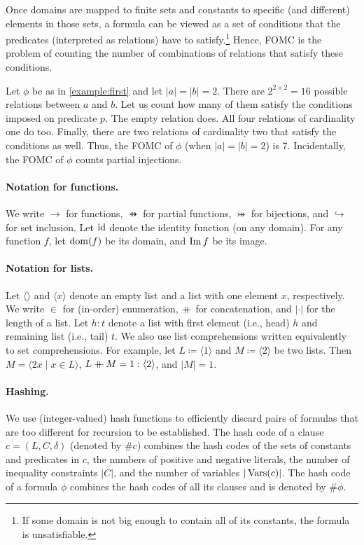 Once domains are mapped to finite sets and constants to specific (and different)
elements in those sets, a formula can be viewed as a set of conditions that the
predicates (interpreted as relations) have to satisfy.\footnote{If some domain
  is not big enough to contain all of its constants, the formula is
  unsatisfiable.} Hence, FOMC is the problem of counting the number of
combinations of relations that satisfy these conditions.

\begin{example}
  Let $\phi$ be as in \cref{example:first} and let $|a| = |b| = 2$. There are
  $2^{2 \times 2} = 16$ possible relations between $a$ and $b$. Let us count how
  many of them satisfy the conditions imposed on predicate $p$. The empty
  relation does. All four relations of cardinality one do too. Finally, there
  are two relations of cardinality two that satisfy the conditions as well.
  Thus, the FOMC of $\phi$ (when $|a| = |b| = 2$) is 7. Incidentally, the FOMC
  of $\phi$ counts partial injections.
\end{example}

\paragraph*{Notation for functions.}
We write $\to$ for functions, $\pfun$ for partial functions,
$\twoheadrightarrowtail$ for bijections, and $\hookrightarrow$ for set
inclusion. Let $\operatorname{id}$ denote the identity function (on any domain). For any
function $f$, let $\operatorname{dom}(f)$ be its domain, and $\operatorname{Im} f$ be its image.

\paragraph*{Notation for lists.}
Let $\langle\rangle$ and $\langle x \rangle$ denote an empty list and a list
with one element $x$, respectively. We write $\in$ for (in-order) enumeration,
$\mathbin{+\mkern-10mu+}$ for concatenation, and $|\cdot|$ for the length of a list. Let
$h : t$ denote a list with first element (i.e., head) $h$ and remaining list
(i.e., tail) $t$. We also use list comprehensions written equivalently to set
comprehensions. For example, let $L \coloneqq \langle 1 \rangle$ and
$M \coloneqq \langle 2 \rangle$ be two lists. Then
$M = \langle 2x \mid x \in L \rangle$,
$L \mathbin{+\mkern-10mu+} M = 1 : \langle 2 \rangle$, and $|M| = 1$.

\paragraph*{Hashing.}
We use (integer-valued) hash functions to efficiently discard pairs of formulas
that are too different for recursion to be established. The hash code of a
clause $c = (L, C, \delta)$ (denoted by $\# c$) combines the hash codes of the
sets of constants and predicates in $c$, the numbers of positive and negative
literals, the number of inequality constraints $|C|$, and the number of
variables $|\operatorname{Vars}(c)|$. The hash code of a formula $\phi$ combines the hash
codes of all its clauses and is denoted by $\#\phi$.

